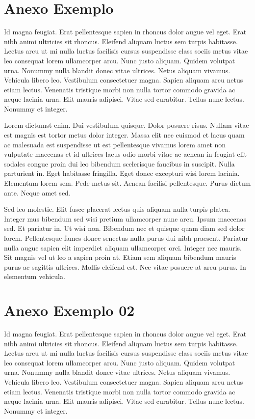 \chapter{Anexo Exemplo}

Id magna feugiat. Erat pellentesque sapien in rhoncus dolor augue vel eget. Erat nibh animi ultricies sit rhoncus. Eleifend aliquam luctus sem turpis habitasse. Lectus arcu ut mi nulla luctus facilisis cursus suspendisse class sociis metus vitae leo consequat lorem ullamcorper arcu. Nunc justo aliquam. Quidem volutpat urna. Nonummy nulla blandit donec vitae ultrices. Netus aliquam vivamus. Vehicula libero leo. Vestibulum consectetuer magna. Sapien aliquam arcu netus etiam lectus. Venenatis tristique morbi non nulla tortor commodo gravida ac neque lacinia urna. Elit mauris adipisci. Vitae sed curabitur. Tellus nunc lectus. Nonummy et integer.

Lorem dictumst enim. Dui vestibulum quisque. Dolor posuere risus. Nullam vitae est magnis est tortor metus dolor integer. Massa elit nec euismod et lacus quam ac malesuada est suspendisse ut est pellentesque vivamus lorem amet non vulputate maecenas et id ultrices lacus odio morbi vitae ac aenean in feugiat elit sodales congue proin dui leo bibendum scelerisque faucibus in suscipit. Nulla parturient in. Eget habitasse fringilla. Eget donec excepturi wisi lorem lacinia. Elementum lorem sem. Pede metus sit. Aenean facilisi pellentesque. Purus dictum ante. Neque amet sed.

Sed leo molestie. Elit fusce placerat lectus quis aliquam nulla turpis platea. Integer mus bibendum sed wisi pretium ullamcorper nunc arcu. Ipsum maecenas sed. Et pariatur in. Ut wisi non. Bibendum nec et quisque quam diam sed dolor lorem. Pellentesque fames donec senectus nulla purus dui nibh praesent. Pariatur nulla augue sapien elit imperdiet aliquam ullamcorper orci. Integer nec mauris. Sit magnis vel ut leo a sapien proin at. Etiam sem aliquam bibendum mauris purus ac sagittis ultrices. Mollis eleifend est. Nec vitae posuere at arcu purus. In elementum vehicula.

\chapter{Anexo Exemplo 02}

Id magna feugiat. Erat pellentesque sapien in rhoncus dolor augue vel eget. Erat nibh animi ultricies sit rhoncus. Eleifend aliquam luctus sem turpis habitasse. Lectus arcu ut mi nulla luctus facilisis cursus suspendisse class sociis metus vitae leo consequat lorem ullamcorper arcu. Nunc justo aliquam. Quidem volutpat urna. Nonummy nulla blandit donec vitae ultrices. Netus aliquam vivamus. Vehicula libero leo. Vestibulum consectetuer magna. Sapien aliquam arcu netus etiam lectus. Venenatis tristique morbi non nulla tortor commodo gravida ac neque lacinia urna. Elit mauris adipisci. Vitae sed curabitur. Tellus nunc lectus. Nonummy et integer.

